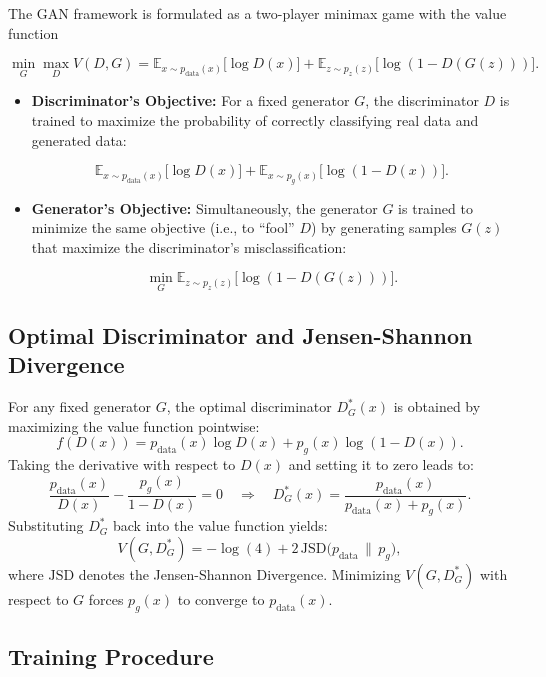 \documentclass{article}
\begin{document}
The GAN framework is formulated as a two-player minimax game with the value function

\[
\min_{G} \max_{D} V(D,G) = \mathbb{E}_{x\sim p_{\text{data}}(x)}\big[\log D(x)\big] + \mathbb{E}_{z\sim p_z(z)}\big[\log (1 - D(G(z)))\big].
\]

\begin{itemize}
    \item \textbf{Discriminator’s Objective:} For a fixed generator $G$, the discriminator $D$ is trained to maximize the probability of correctly classifying real data and generated data:

    \[
    \mathbb{E}_{x\sim p_{\text{data}}(x)}\big[\log D(x)\big] + \mathbb{E}_{x\sim p_g(x)}\big[\log (1 - D(x))\big].
    \]

    \item \textbf{Generator’s Objective:} Simultaneously, the generator $G$ is trained to minimize the same objective (i.e., to “fool” $D$) by generating samples $G(z)$ that maximize the discriminator's misclassification:

    \[
    \min_{G} \mathbb{E}_{z\sim p_z(z)}\big[\log (1 - D(G(z)))\big].
    \]
\end{itemize}

\subsection*{Optimal Discriminator and Jensen-Shannon Divergence}

For any fixed generator $G$, the optimal discriminator $D^*_G(x)$ is obtained by maximizing the value function pointwise:
\[
f(D(x)) = p_{\text{data}}(x) \log D(x) + p_g(x) \log (1 - D(x)).
\]
Taking the derivative with respect to $D(x)$ and setting it to zero leads to:
\[
\frac{p_{\text{data}}(x)}{D(x)} - \frac{p_g(x)}{1-D(x)} = 0 \quad \Longrightarrow \quad D^*_G(x) = \frac{p_{\text{data}}(x)}{p_{\text{data}}(x) + p_g(x)}.
\]
Substituting $D^*_G$ back into the value function yields:
\[
V(G, D^*_G) = -\log(4) + 2\, \mathrm{JSD}\big(p_{\text{data}} \,\|\, p_g\big),
\]
where $\mathrm{JSD}$ denotes the Jensen-Shannon Divergence. Minimizing $V(G, D^*_G)$ with respect to $G$ forces $p_g(x)$ to converge to $p_{\text{data}}(x)$.

\subsection*{Training Procedure}
\end{document}
